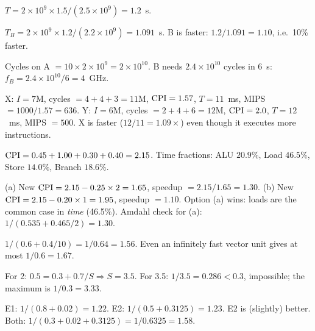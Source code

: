 \documentclass[11pt]{article}
\begin{document}
\begin{solution}[\ref{p:time}]
$T = 2\times10^9 \times 1.5 / (2.5\times10^9) = 1.2$~s.
\end{solution}

\begin{solution}[\ref{p:compare}]
$T_B = 2\times10^9\times1.2/(2.2\times10^9) = 1.091$~s. B is faster:
$1.2/1.091 = 1.10$, i.e.\ 10\% faster.
\end{solution}

\begin{solution}[\ref{p:clock}]
Cycles on A $= 10\times2\times10^9 = 2\times10^{10}$. B needs
$2.4\times10^{10}$ cycles in 6~s: $f_B = 2.4\times10^{10}/6 = 4$~GHz.
\end{solution}

\begin{solution}[\ref{p:compilers}]
X: $I=7$M, cycles $=4+4+3=11$M, $\mathrm{CPI}=1.57$, $T=11$~ms, MIPS
$=1000/1.57=636$.
Y: $I=6$M, cycles $=2+4+6=12$M, $\mathrm{CPI}=2.0$, $T=12$~ms, MIPS $=500$.
X is faster ($12/11=1.09\times$) even though it executes more instructions.
\end{solution}

\begin{solution}[\ref{p:mix}]
$\mathrm{CPI} = 0.45+1.00+0.30+0.40 = 2.15$. Time fractions: ALU $20.9\%$, Load
$46.5\%$, Store $14.0\%$, Branch $18.6\%$.
\end{solution}

\begin{solution}[\ref{p:choose}]
(a) New $\mathrm{CPI} = 2.15-0.25\times2 = 1.65$, speedup $=2.15/1.65=1.30$.
(b) New $\mathrm{CPI} = 2.15-0.20\times1 = 1.95$, speedup $=1.10$.
Option (a) wins: loads are the common case in \emph{time} (46.5\%).
Amdahl check for (a): $1/(0.535+0.465/2) = 1.30$.
\end{solution}

\begin{solution}[\ref{p:vector}]
$1/(0.6+0.4/10) = 1/0.64 = 1.56$. Even an infinitely fast vector unit gives
at most $1/0.6 = 1.67$.
\end{solution}

\begin{solution}[\ref{p:target}]
For 2: $0.5 = 0.3 + 0.7/S \Rightarrow S = 3.5$. For 3.5: $1/3.5=0.286 <
0.3$, impossible; the maximum is $1/0.3=3.33$.
\end{solution}

\begin{solution}[\ref{p:twoenh}]
E1: $1/(0.8+0.02) = 1.22$. E2: $1/(0.5+0.3125) = 1.23$. E2 is (slightly)
better. Both: $1/(0.3+0.02+0.3125)=1/0.6325 = 1.58$.
\end{solution}
\end{document}
